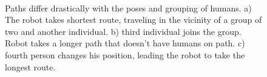 \begin{figure}[hbtp]
\centering
         \\
    \caption{%
	Paths differ drastically with the poses and grouping of humans. a) The robot takes shortest route, traveling in the vicinity of a group of two and another individual. b) third individual joins the group. Robot takes a longer path that doesn't have humans on path. c) fourth person changes his position, leading the robot to take the longest route.
     }%
   \label{fig:sim}
\end{figure}


